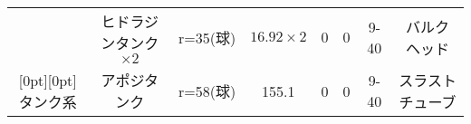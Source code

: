 \begin{tabularx}{55zw}{c|c c c C C C c }
  & ヒドラジンタンク$\times 2$ & r=35(球) & $16.92 \times 2$ & 0 & 0 & 9-40 & バルクヘッド \\ 
  \raisebox{.5\normalbaselineskip}[0pt][0pt]{タンク系}
  & アポジタンク & r=58(球) & 155.1 & 0 & 0 & 9-40 & スラストチューブ \\ \hline

\end{tabularx}
